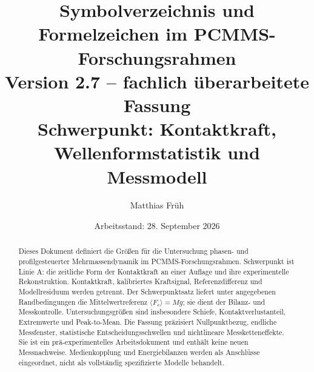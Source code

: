 \documentclass[11pt,a4paper]{article}
\begin{document}
\title{Symbolverzeichnis und Formelzeichen im PCMMS-Forschungsrahmen\\[.5em]\large Version 2.7 -- fachlich überarbeitete Fassung\\Schwerpunkt: Kontaktkraft, Wellenformstatistik und Messmodell}
\author{Matthias Früh}
\date{Arbeitsstand: 28. September 2026}
\maketitle
\begin{abstract}
Dieses Dokument definiert die Größen für die Untersuchung phasen- und profilgesteuerter Mehrmassendynamik im PCMMS-Forschungsrahmen. Schwerpunkt ist Linie A: die zeitliche Form der Kontaktkraft an einer Auflage und ihre experimentelle Rekonstruktion. Kontaktkraft, kalibriertes Kraftsignal, Referenzdifferenz und Modellresiduum werden getrennt. Der Schwerpunktsatz liefert unter angegebenen Randbedingungen die Mit\-tel\-wert\-re\-fe\-renz $\langle F_c\rangle=Mg$; sie dient der Bilanz- und Messkontrolle. Untersuchungsgrößen sind insbesondere Schiefe, Kontaktverlustanteil, Extremwerte und Peak-to-Mean. Die Fassung präzisiert Nullpunktbezug, endliche Messfenster, statistische Entscheidungsschwellen und nichtlineare Messketteneffekte. Sie ist ein prä-experimentelles Arbeitsdokument und enthält keine neuen Messnachweise. Medienkopplung und Energiebilanzen werden als Anschlüsse eingeordnet, nicht als vollständig spezifizierte Modelle behandelt.
\end{abstract}
\clearpage
\tableofcontents
\clearpage
\end{document}
